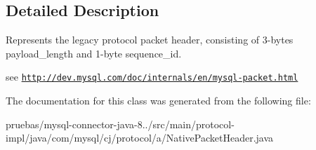 \subsection{Detailed Description}
Represents the legacy protocol packet header, consisting of 3-\/bytes payload\+\_\+length and 1-\/byte sequence\+\_\+id.

see \href{http://dev.mysql.com/doc/internals/en/mysql-packet.html}{\tt http\+://dev.\+mysql.\+com/doc/internals/en/mysql-\/packet.\+html} 

The documentation for this class was generated from the following file\+:\begin{DoxyCompactItemize}
\item 
pruebas/mysql-\/connector-\/java-\/8../src/main/protocol-\/impl/java/com/mysql/cj/protocol/a/Native\+Packet\+Header.\+java\end{DoxyCompactItemize}

